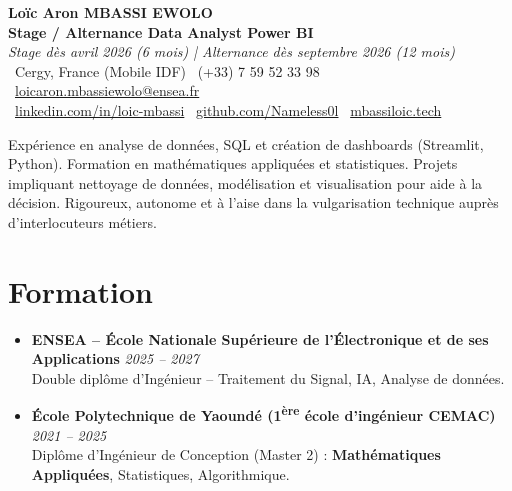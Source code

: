 \documentclass[a4paper,11pt]{article}
\begin{document}
\begin{center}
    {\Large \textbf{Loïc Aron MBASSI EWOLO}} \\ \vspace{4pt}
    \textbf{\large Stage / Alternance Data Analyst Power BI} \\
    \textit{\small Stage dès avril 2026 (6 mois) | Alternance dès septembre 2026 (12 mois)} \\ \vspace{4pt}
    \small
    \faMapMarker\ Cergy, France (Mobile IDF) \quad
    \faPhone\ (+33) 7 59 52 33 98 \quad
    {\color{primary}\faEnvelope\ \href{mailto:loicaron.mbassiewolo@ensea.fr}{loicaron.mbassiewolo@ensea.fr}} \\ \vspace{2pt}
    {\color{primary}\faLinkedin\ \href{https://www.linkedin.com/in/loic-mbassi/}{linkedin.com/in/loic-mbassi}} \quad
    {\color{primary}\faGithub\ \href{https://github.com/Nameless0l}{github.com/Nameless0l}} \quad
    {\color{primary}\faGlobe\ \href{https://mbassiloic.tech}{mbassiloic.tech}}
\end{center}

\vspace{-6pt}

\noindent\small{Expérience en analyse de données, SQL et création de dashboards (Streamlit, Python). Formation en mathématiques appliquées et statistiques. Projets impliquant nettoyage de données, modélisation et visualisation pour aide à la décision. Rigoureux, autonome et à l'aise dans la vulgarisation technique auprès d'interlocuteurs métiers.}

\section{Formation}
\begin{itemize}[leftmargin=*, label=\tiny$\bullet$, nosep]
    \item \textbf{ENSEA -- École Nationale Supérieure de l'Électronique et de ses Applications} \hfill \textit{2025 -- 2027} \\
    \small{Double diplôme d'Ingénieur -- Traitement du Signal, IA, Analyse de données.}
    \item \textbf{École Polytechnique de Yaoundé (1\textsuperscript{ère} école d'ingénieur CEMAC)} \hfill \textit{2021 -- 2025} \\
    \small{Diplôme d'Ingénieur de Conception (Master 2) : \textbf{Mathématiques Appliquées}, Statistiques, Algorithmique.}
\end{itemize}
\end{document}
